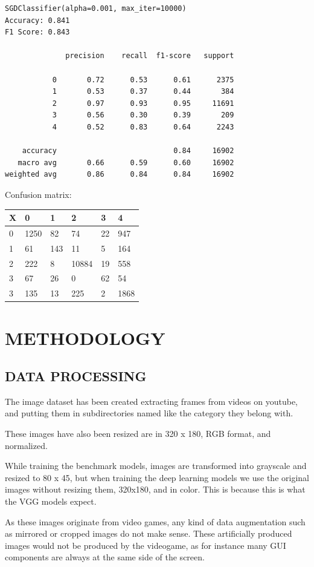 \documentclass[
]{article}
\begin{document}
\begin{verbatim}
SGDClassifier(alpha=0.001, max_iter=10000)
Accuracy: 0.841
F1 Score: 0.843

              precision    recall  f1-score   support

           0       0.72      0.53      0.61      2375
           1       0.53      0.37      0.44       384
           2       0.97      0.93      0.95     11691
           3       0.56      0.30      0.39       209
           4       0.52      0.83      0.64      2243

    accuracy                           0.84     16902
   macro avg       0.66      0.59      0.60     16902
weighted avg       0.86      0.84      0.84     16902
\end{verbatim}

Confusion matrix:

\begin{longtable}[]{@{}llllll@{}}
\toprule
X & 0 & 1 & 2 & 3 & 4\tabularnewline
\midrule
\endhead
0 & 1250 & 82 & 74 & 22 & 947\tabularnewline
1 & 61 & 143 & 11 & 5 & 164\tabularnewline
2 & 222 & 8 & 10884 & 19 & 558\tabularnewline
3 & 67 & 26 & 0 & 62 & 54\tabularnewline
3 & 135 & 13 & 225 & 2 & 1868\tabularnewline
\bottomrule
\end{longtable}

\hypertarget{methodology}{%
\section{METHODOLOGY}\label{methodology}}

\hypertarget{data-processing}{%
\subsection{DATA PROCESSING}\label{data-processing}}

The image dataset has been created extracting frames from videos on
youtube, and putting them in subdirectories named like the category they
belong with. 

These images have also been resized are in 320 x 180, RGB format, and
normalized.

While training the benchmark models, images are transformed into
grayscale and resized to 80 x 45, but when training the deep learning
models we use the original images without resizing them, 320x180, and in color. 
This is because this is what the VGG models expect.

As these images originate from video games, any kind of data
augmentation such as mirrored or cropped images do not make sense. These artificially produced 
images would not be produced by the videogame, as for instance many GUI components are
always at the same side of the screen.
\end{document}
